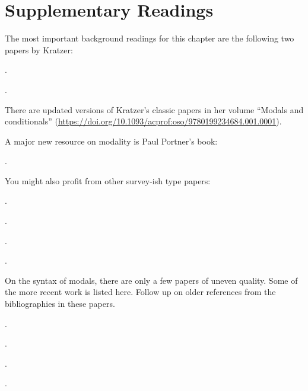 \section{Supplementary Readings} \label{sec:suppl-read-modals}{\setlength{\parindent}{0pt}\setlength{\parskip}{6pt}

  The most important background readings for this chapter are the
  following two papers by Kratzer:

\begin{bibentrylist}
	\item {}.
	\item {}.
\end{bibentrylist}

There are updated versions of Kratzer's classic papers in her volume ``Modals
and conditionals''
(\url{https://doi.org/10.1093/acprof:oso/9780199234684.001.0001}).

A major new resource on modality is Paul Portner's book:

\begin{bibentrylist}
  \item{}.
\end{bibentrylist}

You might also profit from other survey-ish type papers:

\begin{bibentrylist}
  \item {}.
  \item {}.
  \item {}.
  \item {}.
\end{bibentrylist}

On the syntax of modals, there are only a few papers of uneven
quality. Some of the more recent work is listed here. Follow up on
older references from the bibliographies in these papers.

\begin{bibentrylist}
	\item {}. 
	\item {}. 
	\item {}. 
	\item {}. 
\end{bibentrylist}

}
